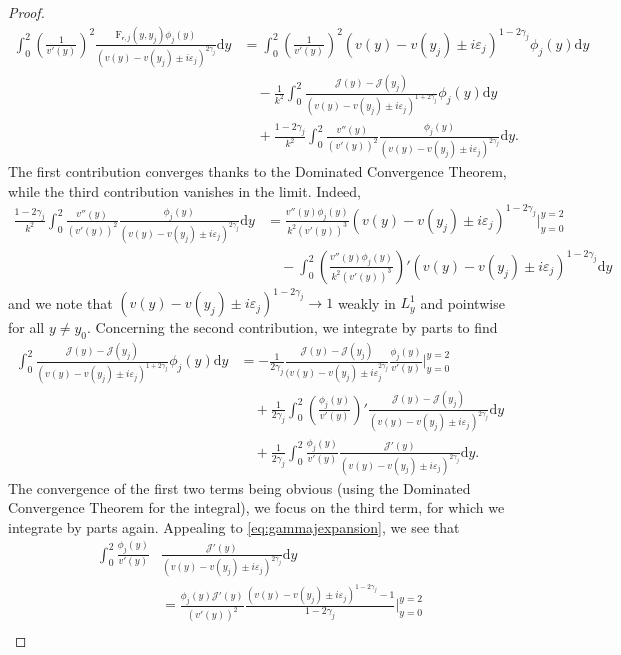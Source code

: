 \documentclass[11pt,reqno]{amsproc}
\theoremstyle{definition}
\numberwithin{equation}{section}
\newcommand{\cJ}{{\mathcal{J}}}
\newcommand{\sr}{{\mathsf{r}}}
\renewcommand{\d}{\mathrm{d}}
\newcommand{\ep}{\varepsilon}
\begin{document}
\begin{proof}
\begin{align*}
\int_0^2 \left( \frac{1}{v'(y)} \right)^2 \frac{\mathrm{F}_{\sr, j}(y,y_j)\phi_j(y)}{(v(y) - v(y_j) \pm i\ep_j)^{2\gamma_j}} \d y &= \int_0^2 \left( \frac{1}{v'(y)}\right)^2 (v(y) - v(y_j) \pm i\ep_j)^{1-2\gamma_j}\phi_j(y) \d y \\
&\quad - \frac{1}{k^2}\int_0^2 \frac{\cJ(y) - \cJ(y_j)}{(v(y) - v(y_j) \pm i\ep_j)^{1+2\gamma_j}}\phi_j(y) \d y \\
&\quad + \frac{1-2\gamma_j}{k^2}\int_0^2 \frac{v''(y)}{(v'(y))^2}\frac{\phi_j(y)}{(v(y) - v(y_j) \pm i\ep_j)^{2\gamma_j} } \d y.
\end{align*}
The first contribution converges thanks to the Dominated Convergence Theorem, while the third contribution vanishes in the limit. Indeed, 
\begin{align*}
\frac{1-2\gamma_j}{k^2}\int_0^2 \frac{v''(y)}{(v'(y))^2}\frac{\phi_j(y)}{(v(y) - v(y_j) \pm i\ep_j)^{2\gamma_j} } \d y &= \frac{v''(y)\phi_j(y)}{k^2(v'(y))^3}(v(y) - v(y_j) \pm i\ep_j)^{1-2\gamma_j}\Big|_{y=0}^{y=2} \\
&\quad - \int_0^2 \left( \frac{v''(y)\phi_j(y)}{k^2(v'(y))^3} \right)' (v(y) - v(y_j) \pm i\ep_j)^{1-2\gamma_j} \d y
\end{align*}
and we note that $(v(y) - v(y_j) \pm i\ep_j)^{1-2\gamma_j}\rightarrow 1$ weakly in $L^1_y$ and pointwise for all $y\neq y_0$. Concerning the second contribution, we integrate by parts to find
\begin{align*}
\int_0^2 \frac{\cJ(y) - \cJ(y_j)}{(v(y) - v(y_j) \pm i\ep_j)^{1+2\gamma_j}}\phi_j(y) \d y &= -\frac{1}{2\gamma_j}\frac{\cJ(y) - \cJ(y_j)}{(v(y) - v(y_j) \pm i\ep_j^{2\gamma_j}}\frac{\phi_j(y)}{v'(y)}\Big|_{y=0}^{y=2} \\
&\quad + \frac{1}{2\gamma_j} \int_0^2 \left( \frac{\phi_j(y)}{v'(y)}\right)'\frac{\cJ(y) - \cJ(y_j)}{(v(y) - v(y_j) \pm i\ep_j)^{2\gamma_j}} \d y \\
&\quad + \frac{1}{2\gamma_j} \int_0^2  \frac{\phi_j(y)}{v'(y)} \frac{\cJ'(y)}{(v(y) - v(y_j) \pm i\ep_j)^{2\gamma_j}} \d y.
\end{align*}
The convergence of the first two terms being obvious (using the Dominated Convergence Theorem for the integral), we focus on the third term, for which we integrate by parts again. Appealing to \eqref{eq:gammajexpansion}, we see that
\begin{align*}
\int_0^2  \frac{\phi_j(y)}{v'(y)} &\frac{\cJ'(y)}{(v(y) - v(y_j) \pm i\ep_j)^{2\gamma_j}} \d y \\
&= \frac{\phi_j(y) \cJ'(y)}{(v'(y))^2}\frac{(v(y) - v(y_j) \pm i\ep_j)^{1-2\gamma_j} - 1}{1-2\gamma_j} \Big|_{y=0}^{y=2} \\

\end{align*}
\end{proof}
\end{document}

